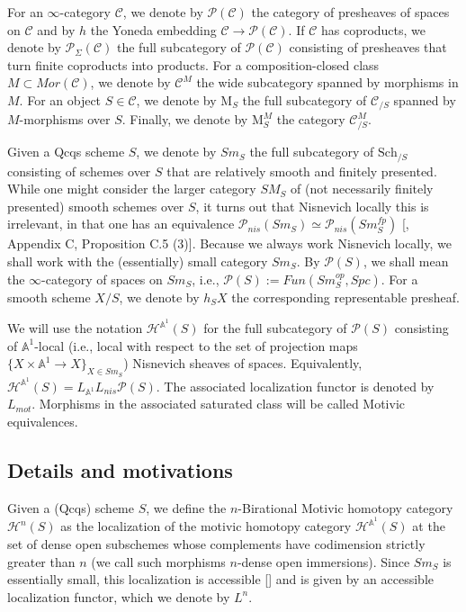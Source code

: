 For an $\infty$-category $\mathcal{C}$, we denote by $\mathcal{P}(\mathcal{C})$ the category of presheaves of spaces on $\mathcal{C}$ and by $h$ the Yoneda embedding $\mathcal{C}\to \mathcal{P}(\mathcal{C})$. If $\mathcal{C}$ has coproducts, we denote by $\mathcal{P}_\Sigma(\mathcal{C})$ the full subcategory of $\mathcal{P}(\mathcal{C})$ consisting of presheaves that turn finite coproducts into products. For a composition-closed class $M\subset Mor(\mathcal{C})$, we denote by $\mathcal{C}^M$ the wide subcategory spanned by morphisms in $M$. For an object $S\in \mathcal{C}$, we denote by $\mathrm{M}_S$ the full subcategory of $\mathcal{C}_{/S}$ spanned by $M$-morphisms over $S$. Finally, we denote by $\mathrm{M}^M_S$ the category $\mathcal{C}^M_{/S}$.



Given a Qcqs scheme $S$, we denote by $Sm_S$ the full subcategory of $\mathrm{Sch}_{/S}$ consisting of schemes over $S$ that are relatively smooth and finitely presented. While one might consider the larger category $SM_S$ of (not necessarily finitely presented) smooth schemes over $S$, it turns out that Nisnevich locally this is irrelevant, in that one has an equivalence $\mathcal{P}_{nis}(Sm_S)\simeq \mathcal{P}_{nis}(Sm_S^{fp})$ [\cite{hoyois2015quadratic}, Appendix C, Proposition C.5 (3)]. Because we always work Nisnevich locally, we shall work with the (essentially) small category $Sm_S$. By $\mathcal{P}(S)$, we shall mean the $\infty$-category of spaces on $Sm_S$, i.e., $\mathcal{P}(S):=Fun(Sm_S^{op},Spc)$. For a smooth scheme $X/S$, we denote by $h_SX$ the corresponding representable presheaf.

We will use the notation $\mathcal{H}^{\mathbb{A}^1}(S)$ for the full subcategory of $\mathcal{P}(S)$ consisting of $\mathbb{A}^1$-local (i.e., local with respect to the set of projection maps $\{X\times \mathbb{A}^1\to X\}_{X\in Sm_S}$) Nisnevich sheaves of spaces. Equivalently, $\mathcal{H}^{\mathbb{A}^1}(S)=L_{\mathbb{A}^1}L_{nis}\mathcal{P}(S)$. The associated localization functor is denoted by $L_{mot}$. Morphisms in the associated saturated class will be called Motivic equivalences. 
\pagebreak

\subsection{Details and motivations}
Given a (Qcqs) scheme $S$, we define the $n$-Birational Motivic homotopy category $\mathcal{H}^{n}(S)$ as the localization of the motivic homotopy category $\mathcal{H}^{\mathbb{A}^1}(S)$ at the set of dense open subschemes whose complements have codimension strictly greater than $n$ (we call such morphisms $n$-dense open immersions). Since $Sm_S$ is essentially small, this localization is accessible [\cite{lurie2009higher}] and is given by an accessible localization functor, which we denote by $L^n$. 

